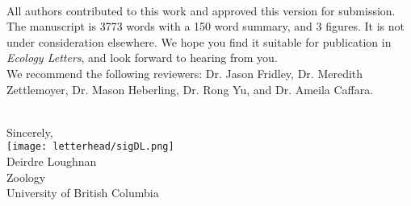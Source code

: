 \documentclass[11pt,a4paper]{article}
\begin{document}
\vspace{1.5ex}\\ 
\noindent All authors contributed to this work and approved this version for submission. The manuscript is 3773 words with a 150 word summary, and 3 figures. It is not under consideration elsewhere. We hope you find it suitable for publication in \emph{Ecology Letters}, and look forward to hearing from you. 
\vspace{1.5ex}\\
\noindent We recommend the following reviewers: Dr. Jason Fridley, Dr. Meredith Zettlemoyer, Dr. Mason Heberling, Dr. Rong Yu, and Dr. Ameila Caffara. 

\vspace{1.5ex}\\
\noindent Sincerely, \\
\texttt{[image: letterhead/sigDL.png]} \\
\noindent Deirdre Loughnan\\
\noindent Zoology\\
\noindent University of British Columbia

\newpage

\vspace{-5ex}
% 


\newpage
\end{document}

